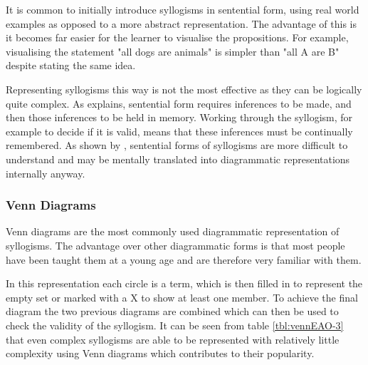 \documentclass[12pt,a4paper]{report}
\begin{document}
It is common to initially introduce syllogisms in sentential form, using real world examples as opposed to a more abstract representation. The advantage of this is it becomes far easier for the learner to visualise the propositions. For example, visualising the statement "all dogs are animals" is simpler than "all A are B" despite stating the same idea. 

Representing syllogisms this way is not the most effective as they can be logically quite complex. As \citep{larkin1987diagram} explains, sentential form requires inferences to be made, and then those inferences to be held in memory. Working through the syllogism, for example to decide if it is valid, means that these inferences must be continually remembered. As shown by \cite{johnson1980mental}, sentential forms of syllogisms are more difficult to understand and may be mentally translated into diagrammatic representations internally anyway. 

\subsubsection{Venn Diagrams}
Venn diagrams are the most commonly used diagrammatic representation of syllogisms. The advantage over other diagrammatic forms is that most people have been taught them at a young age and are therefore very familiar with them. 

In this representation each circle is a term, which is then filled in to represent the empty set or marked with a X to show at least one member. To achieve the final diagram the two previous diagrams are combined which can then  be used to check the validity of the syllogism. It can be seen from table \ref{tbl:vennEAO-3} that even complex syllogisms are able to be represented with relatively little complexity using Venn diagrams which contributes to their popularity. 
\end{document}
